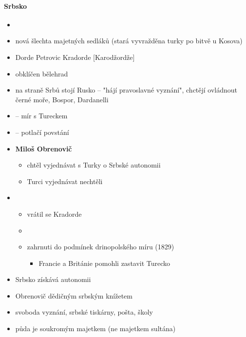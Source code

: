 \paragraph{Srbsko}
\begin{itemize}
\item {}
\item nová šlechta majetných sedláků (stará vyvražděna turky po bitvě u Kosova)
\item Dorde Petrovic Kradorde [Karodžordže]
\item obklíčen bělehrad
\item na straně Srbů stojí Rusko -- "hájí pravoslavné vyznání", chctějí ovládnout černé moře, Bospor, Dardanelli
\item {} -- mír s Tureckem
\item {} -- potlačí povstání
\item \textbf{Miloš Obrenovič}
	\begin{itemize}
	\item chtěl vyjednávat s Turky o Srbské autonomii
	\item Turci vyjednávat nechtěli
	\end{itemize}
\item {}
	\begin{itemize}
	\item vrátil se Kradorde
	\item {}
	\item zahrnuti do podmínek drinopolského míru (1829)
		\begin{itemize}
		\item Francie a Británie pomohli zastavit Turecko
		\end{itemize}
	\end{itemize}
\item Srbsko získává autonomii
\item Obrenovič dědičným srbským knížetem
\item svoboda vyznání, srbské tiskárny, pošta, školy
\item půda je soukromým majetkem (ne majetkem sultána)
\end{itemize}

